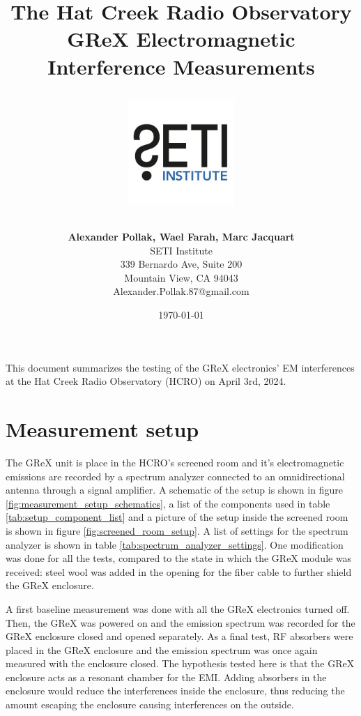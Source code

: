 \documentclass[12pt,a4paper,oneside]{article}
\title{\Huge The Hat Creek Radio Observatory\\
\vspace{0.5cm}
GReX Electromagnetic Interference Measurements\\
\vspace{0.5cm}
\normalsize \emph{}
\vspace{3.5cm}
\begin{center}
\includegraphics[height=4cm]{Figures/SETI_institute_logo.jpg}
\end{center}
}
\author{ 
\vspace{1cm}
\Large
\textbf{Alexander Pollak, Wael Farah, Marc Jacquart} \\
SETI Institute \\ 
339 Bernardo Ave, Suite 200 \\
Mountain View, CA 94043 \\ 
Alexander.Pollak.87@gmail.com\\
}
\date{\today}
\begin{document}
\clearpage\maketitle
\thispagestyle{empty}

\newpage


This document summarizes the testing of the GReX electronics' EM interferences at the Hat Creek Radio Observatory (HCRO) on April 3rd, 2024.

\section{Measurement setup}
\label{sec:Testing}

The GReX unit is place in the HCRO's screened room and it's electromagnetic emissions are recorded by a spectrum analyzer connected to an omnidirectional antenna through a signal amplifier. A schematic of the setup is shown in figure \ref{fig:measurement_setup_schematics}, a list of the components used in table \ref{tab:setup_component_list} and a picture of the setup inside the screened room is shown in figure \ref{fig:screened_room_setup}. A list of settings for the spectrum analyzer is shown in table \ref{tab:spectrum_analyzer_settings}. One modification was done for all the tests, compared to the state in which the GReX module was received: steel wool was added in the opening for the fiber cable to further shield the GReX enclosure.

A first baseline measurement was done with all the GReX electronics turned off. Then, the GReX was powered on and the emission spectrum was recorded for the GReX enclosure closed and opened separately. As a final test, RF absorbers were placed in the GReX enclosure and the emission spectrum was once again measured with the enclosure closed. The hypothesis tested here is that the GReX enclosure acts as a resonant chamber for the EMI. Adding absorbers in the enclosure would reduce the interferences inside the enclosure, thus reducing the amount escaping the enclosure causing interferences on the outside.
\end{document}
